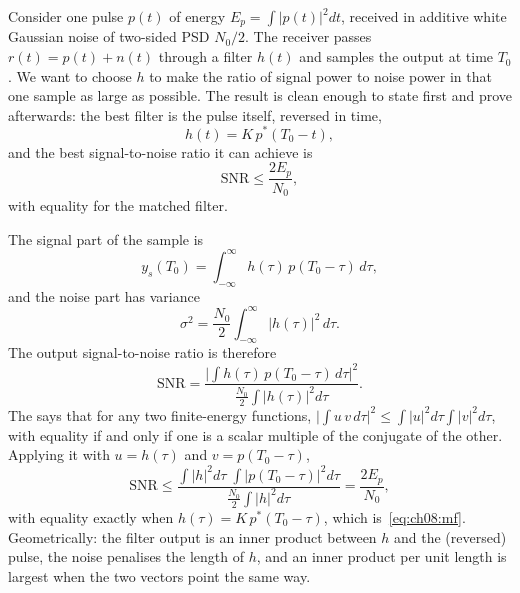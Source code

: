 Consider one pulse $p(t)$ of energy $E_p=\int|p(t)|^2dt$, received in additive white Gaussian
noise of two-sided PSD $N_0/2$. The receiver passes $r(t)=p(t)+n(t)$ through a filter $h(t)$
and samples the output at time $T_0$. We want to choose $h$ to make the ratio of signal power to
noise power in that one sample as large as possible. The result is clean enough to state
first and prove afterwards: the best filter is the pulse itself, reversed in time,
\begin{equation}
\boxed{\;h(t)=K\,p^*(T_0-t),\;}
\label{eq:ch08:mf}
\end{equation}
and the best signal-to-noise ratio it can achieve is
\begin{equation}
\mathrm{SNR}\le\frac{2E_p}{N_0},
\label{eq:ch08:mfsnr}
\end{equation}
with equality for the matched filter.

\begin{deeper}
The signal part of the sample is
\begin{equation*}
y_s(T_0)=\int_{-\infty}^{\infty}h(\tau)\,p(T_0-\tau)\,d\tau,
\end{equation*}
and the noise part has variance
\begin{equation*}
\sigma^2=\frac{N_0}{2}\int_{-\infty}^{\infty}|h(\tau)|^2\,d\tau.
\end{equation*}
The output signal-to-noise ratio is therefore
\begin{equation*}
\mathrm{SNR}=\frac{\big|\int h(\tau)\,p(T_0-\tau)\,d\tau\big|^2}{\frac{N_0}{2}\int|h(\tau)|^2d\tau}.
\end{equation*}
The  says that for any two finite-energy functions,
$\big|\int u\,v\,d\tau\big|^2\le\int|u|^2d\tau\int|v|^2d\tau$, with equality if and only if one is
a scalar multiple of the conjugate of the other. Applying it with $u=h(\tau)$ and
$v=p(T_0-\tau)$,
\begin{equation*}
\mathrm{SNR}\le\frac{\int|h|^2d\tau\;\int|p(T_0-\tau)|^2d\tau}{\frac{N_0}{2}\int|h|^2d\tau}=\frac{2E_p}{N_0},
\end{equation*}
with equality exactly when $h(\tau)=K\,p^*(T_0-\tau)$, which is~\eqref{eq:ch08:mf}.
Geometrically: the filter output is an inner product between $h$ and the (reversed) pulse, the
noise penalises the length of $h$, and an inner product per unit length is largest when the two
vectors point the same way.
\end{deeper}


